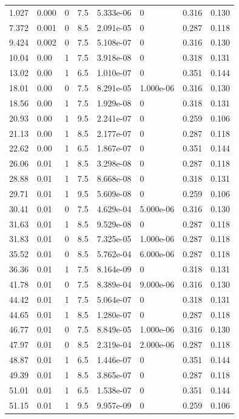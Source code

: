 \documentclass[preview]{standalone}
\begin{document}
{{\begin{tabular}{L{1.2cm}C{1.2cm} C{0.3cm}C{0.5cm} C{1.4cm}C{1.4cm} C{1.4cm}C{1.4cm}}
  1.027  &  0.000  & 0     & 7.5 &  5.333e-06  & 0  & 0.316 &  0.130   \\ 
  7.372  &  0.001  & 0     & 8.5 &  2.091e-05  & 0  & 0.287 &  0.118   \\ 
  9.424  &  0.002  & 0     & 7.5 &  5.108e-07  & 0  & 0.316 &  0.130   \\ 
  10.04  &  0.00  & 1     & 7.5 &  3.918e-08  & 0  & 0.318 &  0.131   \\ 
  13.02  &  0.00  & 1     & 6.5 &  1.010e-07  & 0  & 0.351 &  0.144   \\ 
  18.01  &  0.00  & 0     & 7.5 &  8.291e-05  & 1.000e-06  & 0.316 &  0.130   \\ 
  18.56  &  0.00  & 1     & 7.5 &  1.929e-08  & 0  & 0.318 &  0.131   \\ 
  20.93  &  0.00  & 1     & 9.5 &  2.241e-07  & 0  & 0.259 &  0.106   \\ 
  21.13  &  0.00  & 1     & 8.5 &  2.177e-07  & 0  & 0.287 &  0.118   \\ 
  22.62  &  0.00  & 1     & 6.5 &  1.867e-07  & 0  & 0.351 &  0.144   \\ 
  26.06  &  0.01  & 1     & 8.5 &  3.298e-08  & 0  & 0.287 &  0.118   \\ 
  28.88  &  0.01  & 1     & 7.5 &  8.668e-08  & 0  & 0.318 &  0.131   \\ 
  29.71  &  0.01  & 1     & 9.5 &  5.609e-08  & 0  & 0.259 &  0.106   \\ 
  30.41  &  0.01  & 0     & 7.5 &  4.629e-04  & 5.000e-06  & 0.316 &  0.130   \\ 
  31.63  &  0.01  & 1     & 8.5 &  9.529e-08  & 0  & 0.287 &  0.118   \\ 
  31.83  &  0.01  & 0     & 8.5 &  7.325e-05  & 1.000e-06  & 0.287 &  0.118   \\ 
  35.52  &  0.01  & 0     & 8.5 &  5.762e-04  & 6.000e-06  & 0.287 &  0.118   \\ 
  36.36  &  0.01  & 1     & 7.5 &  8.164e-09  & 0  & 0.318 &  0.131   \\ 
  41.78  &  0.01  & 0     & 7.5 &  8.389e-04  & 9.000e-06  & 0.316 &  0.130   \\ 
  44.42  &  0.01  & 1     & 7.5 &  5.064e-07  & 0  & 0.318 &  0.131   \\ 
  44.65  &  0.01  & 1     & 8.5 &  1.280e-07  & 0  & 0.287 &  0.118   \\ 
  46.77  &  0.01  & 0     & 7.5 &  8.849e-05  & 1.000e-06  & 0.316 &  0.130   \\ 
  47.97  &  0.01  & 0     & 8.5 &  2.319e-04  & 2.000e-06  & 0.287 &  0.118   \\ 
  48.87  &  0.01  & 1     & 6.5 &  1.446e-07  & 0  & 0.351 &  0.144   \\ 
  49.39  &  0.01  & 1     & 8.5 &  3.865e-07  & 0  & 0.287 &  0.118   \\ 
  51.01  &  0.01  & 1     & 6.5 &  1.538e-07  & 0  & 0.351 &  0.144   \\ 
  51.15  &  0.01  & 1     & 9.5 &  9.957e-09  & 0  & 0.259 &  0.106   \\ 
\hline 
\end{tabular} 

}}
\end{document}
